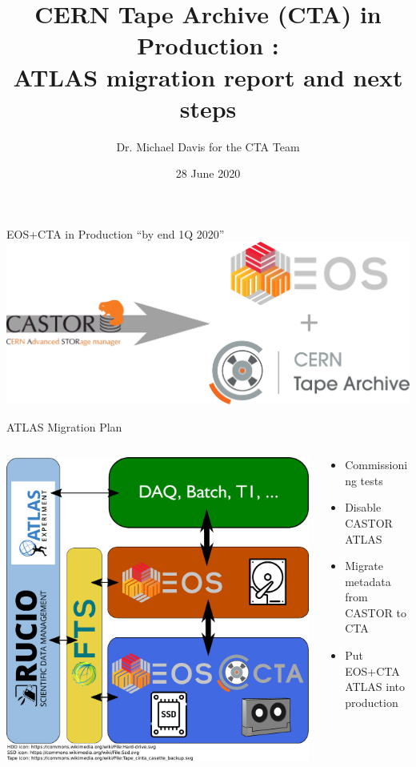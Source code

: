 \documentclass[aspectratio=1610]{beamer}
\author{\Large Dr. Michael Davis for the CTA Team}
\title[CTA in Production (ATLAS)]{CERN Tape Archive (CTA) in Production :\\
ATLAS migration report and next steps\\}
\date{28 June 2020}
\begin{document}
\frame{\titlepage}

\begin{frame}{EOS+CTA in Production ``by end 1Q 2020''}
   \centering
   \includegraphics[width=\textwidth]{images/CASTOR_EOS+CTA_Logo}
\end{frame}

\begin{frame}{ATLAS Migration Plan}
\begin{columns}
	\begin{column}{0.4\textwidth}
		\begin{center}
         \includegraphics[width=\textwidth]{images/CTA_Deployment_Atlas}
		\end{center}
	\end{column}
	\begin{column}{0.55\textwidth}
   \begin{itemize}
      \item Commissioning tests
      \item Disable CASTOR ATLAS
      \item Migrate metadata from CASTOR to CTA
      \item Put EOS+CTA ATLAS into production
   \end{itemize}
	\end{column}
\end{columns}
\end{frame}
\end{document}

